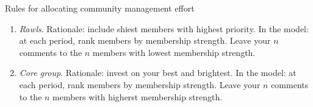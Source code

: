 Rules for allocating community management effort

\begin{enumerate}
	\item \emph{Rawls}. Rationale: include shiest members with highest priority. In the model: at each period, rank members by membership strength. Leave your $n$ comments to the $n$ members with lowest membership strength. 
	\item \emph{Core group}. Rationale: invest on your best and brightest. In the model: at each period, rank members by membership strength. Leave your $n$ comments to the $n$ members with higherst membership strength.
\end{enumerate}